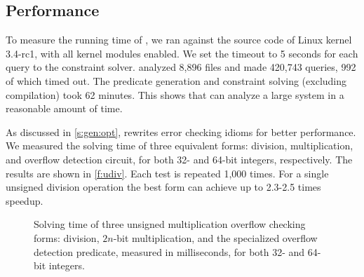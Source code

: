 
\subsection{Performance}
\label{s:eval:perf}

To measure the running time of \sys, we ran \sys against the source
code of Linux kernel 3.4-rc1, with all kernel modules enabled. 
We set the timeout to 5 seconds for each query to the constraint solver.
\sys analyzed 8,896 files and made 420,743 queries, 992 of which timed out.
The predicate generation and constraint solving (excluding compilation)
took 62 minutes.  This shows that \sys can analyze a large
system in a reasonable amount of time.

As discussed in \autoref{s:gen:opt}, \sys rewrites error checking
idioms for better performance.  We measured the solving time of three
equivalent forms: division, multiplication, and overflow detection
circuit, for both 32- and 64-bit integers, respectively.  The results
are shown in \autoref{f:udiv}.  Each test is repeated 1,000 times.
For a single unsigned division operation the best form can
achieve up to 2.3-2.5 times speedup.

\begin{figure}
\centering

\caption{Solving time of three unsigned multiplication overflow
checking forms: division, $2n$-bit multiplication, and the specialized
overflow detection predicate, measured in milliseconds, for both
32- and 64-bit integers.}
\label{f:udiv}
\end{figure}

\fi
